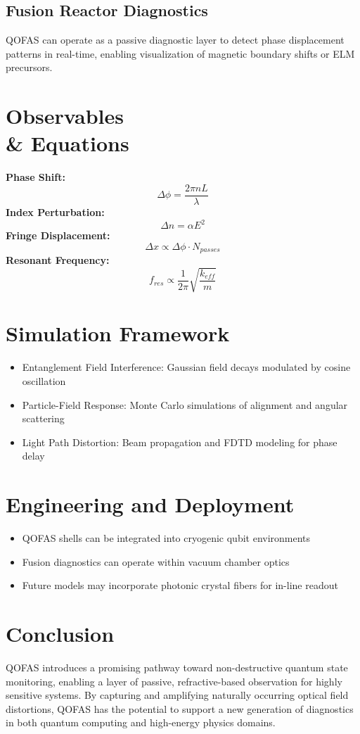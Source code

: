 \documentclass[11pt]{article}
\begin{document}
\subsection{Fusion Reactor Diagnostics}
QOFAS can operate as a passive diagnostic layer to detect phase displacement patterns in real-time, enabling visualization of magnetic boundary shifts or ELM precursors.

\section{Observables \\& Equations}
\textbf{Phase Shift:} \[ \Delta \phi = \frac{2 \pi n L}{\lambda} \]
\textbf{Index Perturbation:} \[ \Delta n = \alpha E^2 \]
\textbf{Fringe Displacement:} \[ \Delta x \propto \Delta \phi \cdot N_{passes} \]
\textbf{Resonant Frequency:} \[ f_{res} \propto \frac{1}{2 \pi} \sqrt{\frac{k_{eff}}{m}} \]

\section{Simulation Framework}
\begin{itemize}
  \item Entanglement Field Interference: Gaussian field decays modulated by cosine oscillation
  \item Particle-Field Response: Monte Carlo simulations of alignment and angular scattering
  \item Light Path Distortion: Beam propagation and FDTD modeling for phase delay
\end{itemize}

\section{Engineering and Deployment}
\begin{itemize}
  \item QOFAS shells can be integrated into cryogenic qubit environments
  \item Fusion diagnostics can operate within vacuum chamber optics
  \item Future models may incorporate photonic crystal fibers for in-line readout
\end{itemize}

\section{Conclusion}
QOFAS introduces a promising pathway toward non-destructive quantum state monitoring, enabling a layer of passive, refractive-based observation for highly sensitive systems. By capturing and amplifying naturally occurring optical field distortions, QOFAS has the potential to support a new generation of diagnostics in both quantum computing and high-energy physics domains.
\end{document}
